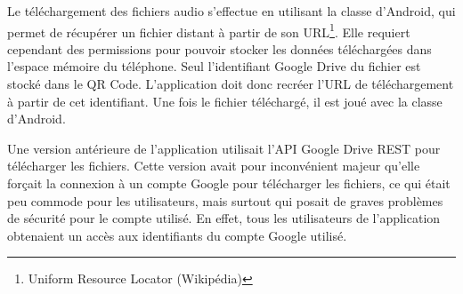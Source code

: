 \par
Le téléchargement des fichiers audio s'effectue en utilisant la classe  d'Android, qui permet de récupérer un fichier distant à partir de son URL\footnote{Uniform Resource Locator (Wikipédia)}. Elle requiert cependant des permissions pour pouvoir stocker les données téléchargées dans l'espace mémoire du téléphone. Seul l'identifiant Google Drive du fichier est stocké dans le QR Code. L'application doit donc recréer l'URL de téléchargement	à partir de cet identifiant. Une fois le fichier téléchargé, il est joué avec la classe  d'Android.\\

\par
Une version antérieure de l'application utilisait l'API Google Drive REST pour télécharger les fichiers. Cette version avait pour inconvénient majeur qu'elle forçait la connexion à un compte Google pour télécharger les fichiers, ce qui était peu commode pour les utilisateurs, mais surtout qui posait de graves problèmes de sécurité pour le compte utilisé. En effet, tous les utilisateurs de l'application obtenaient un accès aux identifiants du compte Google utilisé.
